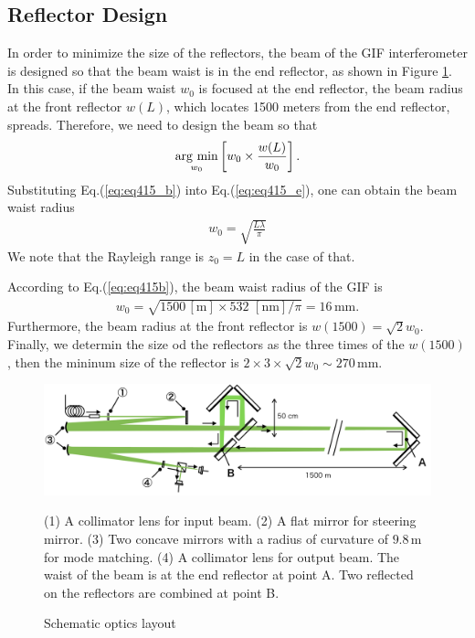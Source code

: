 \subsection{Reflector Design}
In order to minimize the size of the reflectors, the beam of the GIF interferometer is designed so that the beam waist is in the end reflector, as shown in Figure \ref{img:img416}. In this case, if the beam waist $w_0$ is focused at the end reflector, the beam radius at the front reflector $w(L)$, which locates 1500 meters from the end reflector, spreads. Therefore, we need to design the beam so that
\begin{eqnarray}
  \mathop{\rm arg~min}\limits_{w_0} \left[w_0\times\frac{w(L)}{w_0}\right]. \label{eq:eq415_e}
\end{eqnarray}
Substituting Eq.(\ref{eq:eq415_b}) into Eq.(\ref{eq:eq415_e}), one can obtain the beam waist radius
\begin{eqnarray}
  w_0 = \sqrt{\frac{{L\lambda}}{\pi}} \label{eq:eq415b}
\end{eqnarray}
We note that the Rayleigh range is $z_0 = L$ in the case of that.

According to Eq.(\ref{eq:eq415b}), the beam waist radius of the GIF is
\begin{eqnarray}
  w_0=\sqrt{{1500\,\mathrm{[m]}}\times 532\,\,\mathrm{[nm]}/\pi} = 16\,\mathrm{mm}.
\end{eqnarray}
Furthermore, the beam radius at the front reflector is $w(1500)=\sqrt{2}{w_0}$. Finally, we determin the size od the reflectors as the three times of the $w(1500)$, then the mininum size of the reflector is $2\times3\times\sqrt{2}w_0\sim270\,\mathrm{mm}$.

\begin{figure}[p]
  \begin{center}   
    \includegraphics[width=14cm]{./img_chap4/img416.png}
    \caption{Schematic optics layout}{(1) A collimator lens for input beam. (2) A flat mirror for steering mirror. (3) Two concave mirrors with a radius of curvature of $9.8\,\mathrm{m}$ for mode matching. (4) A collimator lens for output beam. The waist of the beam is at the end reflector at point A. Two reflected on the reflectors are combined at point B.}\label{img:img416}
  \end{center}
\end{figure}


